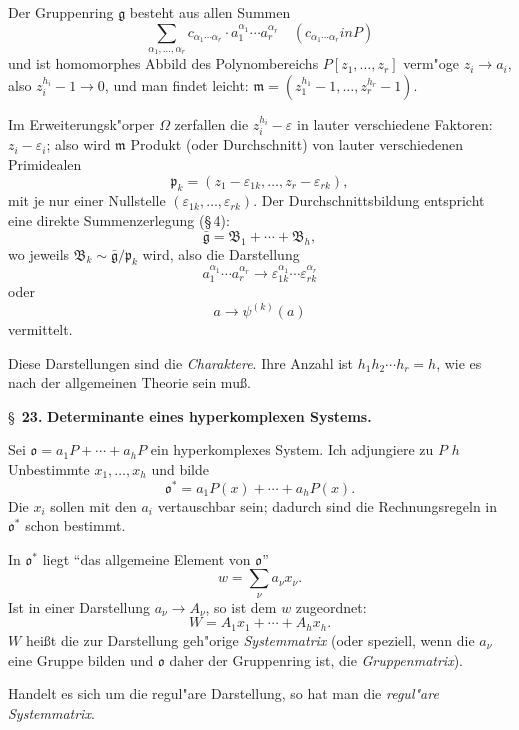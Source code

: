 \documentclass[12pt,a4paper]{article}
\theoremstyle{plain}
\begin{document}
Der Gruppenring $\mathfrak{g}$ besteht aus allen Summen
\[
\sum_{\alpha_1,\ldots,\alpha_r} c_{\alpha_1\cdots\alpha_r} \cdot a_1^{\alpha_1} \cdots a_r^{\alpha_r}
\quad(c_{\alpha_1\cdots\alpha_r} { in } P)
\]
und ist homomorphes Abbild des Polynombereichs $P[z_1,\ldots,z_r]$ verm"oge $z_i \to a_i$, also $z_i^{h_i} - 1 \to 0$, und man findet leicht: $\mathfrak{m} = (z_1^{h_1}-1, \ldots, z_r^{h_r}-1)$.

Im Erweiterungsk"orper $\Omega$ zerfallen die $z_i^{h_i} - \varepsilon$ in lauter verschiedene Faktoren: $z_i - \varepsilon_i$; also wird $\mathfrak{m}$ Produkt (oder Durchschnitt) von lauter verschiedenen Primidealen
\[
\mathfrak{p}_k = (z_1 - \varepsilon_{1k}, \ldots, z_r - \varepsilon_{rk}),
\]
mit je nur einer Nullstelle $(\varepsilon_{1k},\ldots,\varepsilon_{rk})$. Der Durchschnittsbildung entspricht eine direkte Summenzerlegung (\S\,4):
\[
\bar{\mathfrak{g}} = \mathfrak{B}_1 + \cdots + \mathfrak{B}_h,
\]
wo jeweils $\mathfrak{B}_k \sim \bar{\mathfrak{g}}/\mathfrak{p}_k$ wird, also die Darstellung
\[
a_1^{\alpha_1} \cdots a_r^{\alpha_r} \to \varepsilon_{1k}^{\alpha_1} \cdots \varepsilon_{rk}^{\alpha_r}
\]
oder
\[
a \to \psi^{(k)}(a)
\]
vermittelt.

Diese Darstellungen sind die \textit{Charaktere}. Ihre Anzahl ist $h_1 h_2 \cdots h_r = h$, wie es nach der allgemeinen Theorie sein mu\ss.

\newpage
\S~\textbf{23.}
\textbf{Determinante eines hyperkomplexen Systems.}

\smallskip

\noindent
Sei $\mathfrak{o} = a_1P + \cdots + a_hP$ ein hyperkomplexes System. Ich adjungiere zu $P$ $h$ Unbestimmte $x_1,\ldots,x_h$ und bilde
\[
\mathfrak{o}^* = a_1P(x) + \cdots + a_hP(x).\tag{*}
\]
Die $x_i$ sollen mit den $a_i$ vertauschbar sein; dadurch sind die Rechnungsregeln in $\mathfrak{o}^*$ schon bestimmt.

In $\mathfrak{o}^*$ liegt ``das allgemeine Element von $\mathfrak{o}$''
\[
w = \sum_\nu a_\nu x_\nu.
\]
Ist in einer Darstellung $a_\nu \to A_\nu$, so ist dem $w$ zugeordnet:
\[
W = A_1x_1 + \cdots + A_hx_h.
\]
$W$ hei\ss t die zur Darstellung geh"orige \textit{Systemmatrix} (oder speziell, wenn die $a_\nu$ eine Gruppe bilden und $\mathfrak{o}$ daher der Gruppenring ist, die \textit{Gruppenmatrix}).

Handelt es sich um die regul"are Darstellung, so hat man die \textit{regul"are Systemmatrix}.
\end{document}
